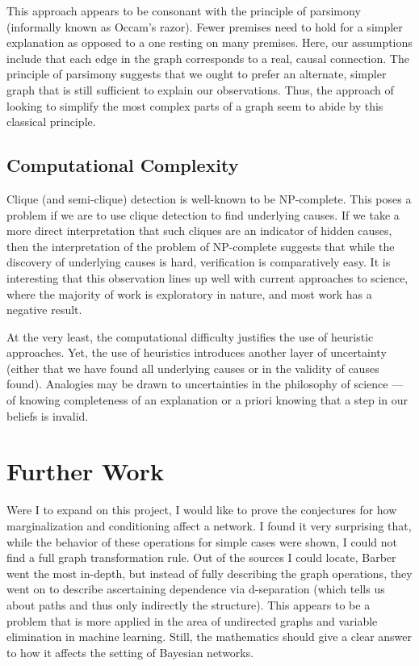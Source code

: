 \documentclass{article}
\begin{document}
	This approach appears to be consonant with the principle of parsimony (informally known as Occam's razor).
	Fewer premises need to hold for a simpler explanation as opposed to a one resting on many premises.
	Here, our assumptions include that each edge in the graph corresponds to a real, causal connection.
	The principle of parsimony suggests that we ought to prefer an alternate, simpler graph that is still sufficient to explain our observations.
	Thus, the approach of looking to simplify the most complex parts of a graph seem to abide by this classical principle.
	
	\subsection{Computational Complexity}
	Clique (and semi-clique) detection is well-known to be NP-complete.
	This poses a problem if we are to use clique detection to find underlying causes.
	If we take a more direct interpretation that such cliques are an indicator of hidden causes, then the interpretation of the problem of NP-complete suggests that while the discovery of underlying causes is hard, verification is comparatively easy.
	It is interesting that this observation lines up well with current approaches to science, where the majority of work is exploratory in nature, and most work has a negative result.
	
	At the very least, the computational difficulty justifies the use of heuristic approaches.
	Yet, the use of heuristics introduces another layer of uncertainty (either that we have found all underlying causes or in the validity of causes found).
	Analogies may be drawn to uncertainties in the philosophy of science --- of knowing completeness of an explanation or a priori knowing that a step in our beliefs is invalid.
	
	\section{Further Work}
	Were I to expand on this project, I would like to prove the conjectures for how marginalization and conditioning affect a network.
	I found it very surprising that, while the behavior of these operations for simple cases were shown, I could not find a full graph transformation rule.
	Out of the sources I could locate, Barber\cite{barberBRML2012} went the most in-depth, but instead of fully describing the graph operations, they went on to describe ascertaining dependence via d-separation (which tells us about paths and thus only indirectly the structure).
	This appears to be a problem that is more applied in the area of undirected graphs and variable elimination in machine learning.
	Still, the mathematics should give a clear answer to how it affects the setting of Bayesian networks.
	
\end{document}
